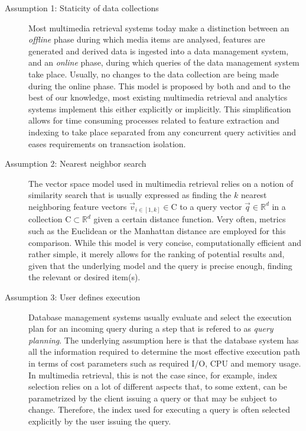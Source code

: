 \begin{description}
    \item[Assumption 1: Staticity of data collections] Most multimedia retrieval systems today make a distinction between an \emph{offline} phase during which media items are analysed, features are generated and derived data is ingested into a data management system, and an \emph{online} phase, during which queries of the data management system take place. Usually, no changes to the data collection are being made during the online phase. This model is proposed by both \cite{Giangreco:2018Database} and \cite{Rossetto:2018thesis} and to the best of our knowledge, most existing multimedia retrieval and analytics systems implement this either explicitly or implicitly. This simplification allows for time consuming processes related to feature extraction and indexing to take place separated from any concurrent query activities and eases requirements on transaction isolation. 

    \item[Assumption 2: Nearest neighbor search] The vector space model used in multimedia retrieval relies on a notion of similarity search that is usually expressed as finding the $k$ nearest neighboring feature vectors $\vec{v}_{i \in \left[1,k\right]} \in \mathrm{C}$ to a query vector $\vec{q} \in \mathbb{R}^d$ in a collection $\mathrm{C} \subset \mathbb{R}^d$ given a certain distance function. Very often, metrics such as the Euclidean or the Manhattan distance are employed for this comparison. While this model is very concise, computationally efficient and rather simple, it merely allows for the ranking of potential results and, given that the underlying model and the query is precise enough, finding the relevant or desired item(s).

    \item[Assumption 3: User defines execution] Database management systems usually evaluate and select the execution plan for an incoming query during a step that is refered to as \emph{query planning}. The underlying assumption here is that the database system has all the information required to determine the most effective execution path in terms of cost parameters such as required I/O, CPU and memory usage. In multimedia retrieval, this is not the case since, for example, index selection relies on a lot of different aspects that, to some extent, can be parametrized by the client issuing a query or that may be subject to change. Therefore, the index used for executing a query is often selected explicitly by the user issuing the query.
\end{description}

